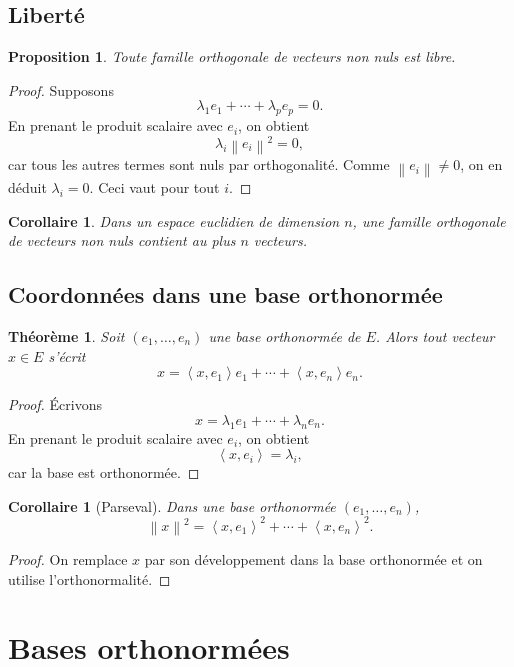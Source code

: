 \documentclass[11pt,a4paper]{article}
\newtheorem{theoreme}[definition]{Théorème}
\newtheorem{proposition}[definition]{Proposition}
\newtheorem{corollaire}[definition]{Corollaire}
\theoremstyle{remark}
\newcommand{\Norm}[1]{\left\|#1\right\|}
\newcommand{\scal}[2]{\left\langle #1,#2\right\rangle}
\begin{document}
\subsection{Liberté}

\begin{proposition}
Toute famille orthogonale de vecteurs non nuls est libre.
\end{proposition}

\begin{proof}
Supposons
\[
\lambda_1e_1+\cdots+\lambda_pe_p=0.
\]
En prenant le produit scalaire avec \(e_i\), on obtient
\[
\lambda_i\Norm{e_i}^2=0,
\]
car tous les autres termes sont nuls par orthogonalité. Comme \(\Norm{e_i}\neq 0\), on en déduit \(\lambda_i=0\). Ceci vaut pour tout \(i\).
\end{proof}

\begin{corollaire}
Dans un espace euclidien de dimension \(n\), une famille orthogonale de vecteurs non nuls contient au plus \(n\) vecteurs.
\end{corollaire}

\subsection{Coordonnées dans une base orthonormée}

\begin{theoreme}
Soit \((e_1,\dots,e_n)\) une base orthonormée de \(E\). Alors tout vecteur \(x\in E\) s’écrit
\[
x=\scal{x}{e_1}e_1+\cdots+\scal{x}{e_n}e_n.
\]
\end{theoreme}

\begin{proof}
Écrivons
\[
x=\lambda_1e_1+\cdots+\lambda_ne_n.
\]
En prenant le produit scalaire avec \(e_i\), on obtient
\[
\scal{x}{e_i}=\lambda_i,
\]
car la base est orthonormée.
\end{proof}

\begin{corollaire}[Parseval]
Dans une base orthonormée \((e_1,\dots,e_n)\),
\[
\Norm{x}^2=\scal{x}{e_1}^2+\cdots+\scal{x}{e_n}^2.
\]
\end{corollaire}

\begin{proof}
On remplace \(x\) par son développement dans la base orthonormée et on utilise l’orthonormalité.
\end{proof}

\section{Bases orthonormées}
\end{document}
